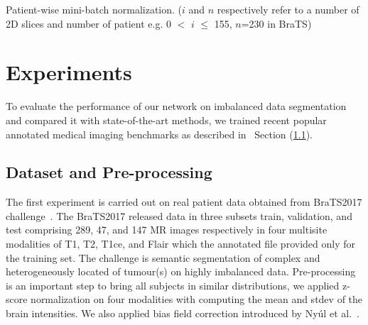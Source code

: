 \documentclass[10pt,twocolumn,letterpaper]{article}
\begin{document}
\begin{algorithm}



\caption{Patient-wise mini-batch normalization. ($i$ and $n$ respectively refer to a number of 2D slices and number of patient e.g. 0 $<$ $i$ $\leq$ 155, $n$=230 in BraTS)}
\label{minibatch_alg}
\end{algorithm}

\section{Experiments}\label{experiment}
To evaluate the performance of our network on imbalanced data segmentation and compared it with state-of-the-art methods, we trained recent popular annotated medical imaging benchmarks as described in~ Section (\ref{datasets}).

\subsection{Dataset and Pre-processing}\label{datasets}

The first experiment is carried out on real patient data obtained from BraTS2017 challenge~\cite{Menze2014,Bakasnature2017,Bakastcg2017,Bakaslgg2017}.
The BraTS2017 released data in three subsets train, validation, and test comprising 289, 47, and 147 MR images respectively in four multisite modalities of T1, T2, T1ce, and Flair which the annotated file provided only for the training set. The challenge is semantic segmentation of complex and heterogeneously located of tumour(s) on highly imbalanced data. Pre-processing is an important step to bring all subjects in similar distributions, we applied z-score normalization on four modalities with computing the mean and stdev of the brain intensities. We also applied bias field correction introduced by Ny{\'u}l et al.~\cite{nyul2000new}.
\end{document}
